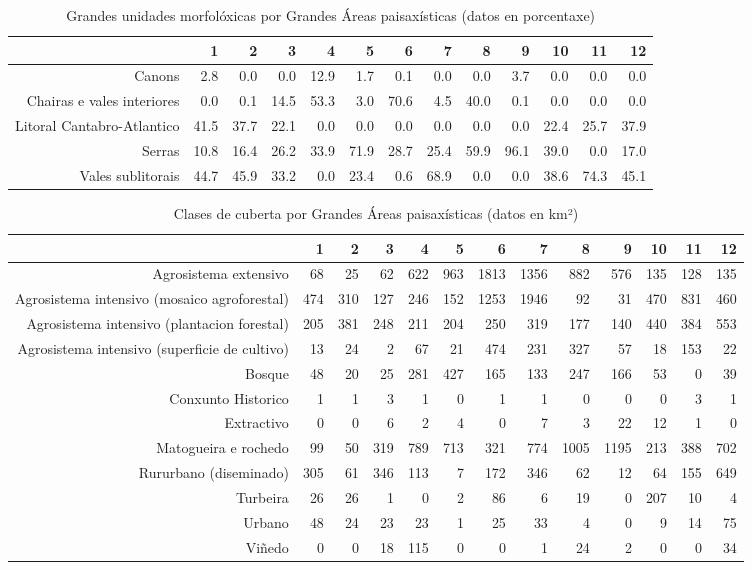 \begin{table}[p]
\centering
\caption{Grandes unidades morfolóxicas por Grandes Áreas paisaxísticas (datos en porcentaxe)} 
\label{xtaboa1p}
\begin{tabular}{rrrrrrrrrrrrr}
  \hline
 & 1 & 2 & 3 & 4 & 5 & 6 & 7 & 8 & 9 & 10 & 11 & 12 \\ 
  \hline
Canons & 2.8 & 0.0 & 0.0 & 12.9 & 1.7 & 0.1 & 0.0 & 0.0 & 3.7 & 0.0 & 0.0 & 0.0 \\ 
  Chairas e vales interiores & 0.0 & 0.1 & 14.5 & 53.3 & 3.0 & 70.6 & 4.5 & 40.0 & 0.1 & 0.0 & 0.0 & 0.0 \\ 
  Litoral Cantabro-Atlantico & 41.5 & 37.7 & 22.1 & 0.0 & 0.0 & 0.0 & 0.0 & 0.0 & 0.0 & 22.4 & 25.7 & 37.9 \\ 
  Serras & 10.8 & 16.4 & 26.2 & 33.9 & 71.9 & 28.7 & 25.4 & 59.9 & 96.1 & 39.0 & 0.0 & 17.0 \\ 
  Vales sublitorais & 44.7 & 45.9 & 33.2 & 0.0 & 23.4 & 0.6 & 68.9 & 0.0 & 0.0 & 38.6 & 74.3 & 45.1 \\ 
   \hline
\end{tabular}
\end{table}
\begin{table}[p]
\centering
\caption{Clases de cuberta por Grandes Áreas paisaxísticas (datos en km²)} 
\label{xtaboa2}
\begin{tabular}{rrrrrrrrrrrrr}
  \hline
 & 1 & 2 & 3 & 4 & 5 & 6 & 7 & 8 & 9 & 10 & 11 & 12 \\ 
  \hline
Agrosistema extensivo & 68 & 25 & 62 & 622 & 963 & 1813 & 1356 & 882 & 576 & 135 & 128 & 135 \\ 
  Agrosistema intensivo (mosaico agroforestal) & 474 & 310 & 127 & 246 & 152 & 1253 & 1946 & 92 & 31 & 470 & 831 & 460 \\ 
  Agrosistema intensivo (plantacion forestal) & 205 & 381 & 248 & 211 & 204 & 250 & 319 & 177 & 140 & 440 & 384 & 553 \\ 
  Agrosistema intensivo (superficie de cultivo) & 13 & 24 & 2 & 67 & 21 & 474 & 231 & 327 & 57 & 18 & 153 & 22 \\ 
  Bosque & 48 & 20 & 25 & 281 & 427 & 165 & 133 & 247 & 166 & 53 & 0 & 39 \\ 
  Conxunto Historico & 1 & 1 & 3 & 1 & 0 & 1 & 1 & 0 & 0 & 0 & 3 & 1 \\ 
  Extractivo & 0 & 0 & 6 & 2 & 4 & 0 & 7 & 3 & 22 & 12 & 1 & 0 \\ 
  Matogueira e rochedo & 99 & 50 & 319 & 789 & 713 & 321 & 774 & 1005 & 1195 & 213 & 388 & 702 \\ 
  Rururbano (diseminado) & 305 & 61 & 346 & 113 & 7 & 172 & 346 & 62 & 12 & 64 & 155 & 649 \\ 
  Turbeira & 26 & 26 & 1 & 0 & 2 & 86 & 6 & 19 & 0 & 207 & 10 & 4 \\ 
  Urbano & 48 & 24 & 23 & 23 & 1 & 25 & 33 & 4 & 0 & 9 & 14 & 75 \\ 
  Viñedo & 0 & 0 & 18 & 115 & 0 & 0 & 1 & 24 & 2 & 0 & 0 & 34 \\ 
   \hline
\end{tabular}
\end{table}
